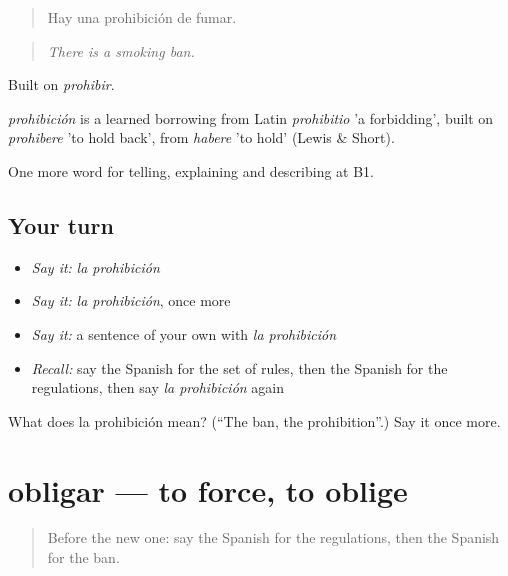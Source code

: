 \begin{quote}
Hay una prohibición de fumar.
\end{quote}

\begin{quote}
\emph{There is a smoking ban.}
\end{quote}

Built on \emph{prohibir}.

\begin{cousinweb}
\emph{prohibición} is a learned borrowing from Latin \emph{prohibitio} 'a forbidding', built on \emph{prohibere} 'to hold back', from \emph{habere} 'to hold' (Lewis \& Short).
\end{cousinweb}

\begin{grammarlens}[title={What you've built}]
One more word for telling, explaining and describing at B1.
\end{grammarlens}

\subsection*{Your turn}
\begin{itemize}
\raggedright
  \item \emph{Say it:} \emph{la prohibición}
  \item \emph{Say it:} \emph{la prohibición}, once more
  \item \emph{Say it:} a sentence of your own with \emph{la prohibición}
  \item \emph{Recall:} say the Spanish for the set of rules, then the Spanish for the regulations, then say \emph{la prohibición} again
\end{itemize}

\begin{tcolorbox}[breakable,colback=teal!4,colframe=teal!35!black,title={Before you move on}]
What does la prohibición mean? (\textquotedblleft{}The ban, the prohibition\textquotedblright{}.) Say it once more.
\end{tcolorbox}
\section[obligar]{obligar — to force, to oblige}

\label{lesson:ES-C622-obligar}



\begin{quote}
Before the new one: say the Spanish for the regulations, then the Spanish for the ban.
\end{quote}

